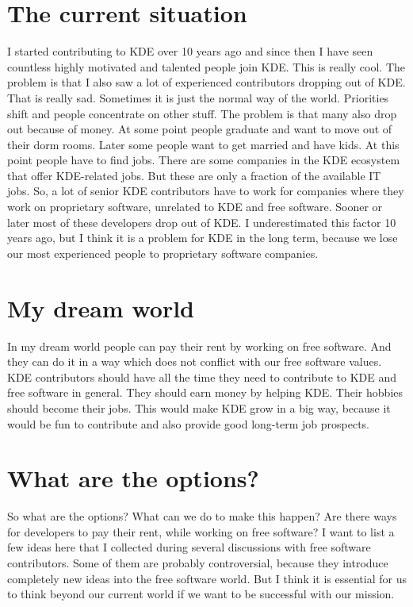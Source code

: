 \section*{The current situation}

I started contributing to KDE over 10 years ago and since then I have seen countless highly motivated and talented people join KDE. This is really cool. The problem is that I also saw a lot of experienced contributors dropping out of KDE. That is really sad. Sometimes it is just the normal way of the world. Priorities shift and people concentrate on other stuff. The problem is that many also drop out because of money. At some point people graduate and want to move out of their dorm rooms. Later some people want to get married and have kids. At this point people have to find jobs. There are some companies in the KDE ecosystem that offer KDE-related jobs. But these are only a fraction of the available IT jobs. So, a lot of senior KDE contributors have to work for companies where they  work on proprietary software, unrelated to KDE and free software. Sooner or later most of these developers drop out of KDE.
I underestimated this factor 10 years ago, but I think it is a problem for KDE in the long term, because we lose our most experienced people to proprietary software companies.

\section*{My dream world}

In my dream world people can pay their rent by working on free software. And they can do it in a way which does not conflict with our free software values. KDE contributors should have all the time they need to contribute to KDE and free software in general. They should earn money by helping KDE. Their hobbies should become their jobs. This would make KDE grow in a big way, because it would be fun to contribute and also provide good long-term job prospects.  

\section*{What are the options?}

So what are the options? What can we do to make this happen? Are there ways for developers to pay their rent, while working on free software? I want to list a few ideas here that I collected during several discussions with free software contributors. Some of them are probably controversial, because they introduce completely new ideas into the free software world. But I think it is essential for us to think beyond our current world if we want to be successful with our mission.  

